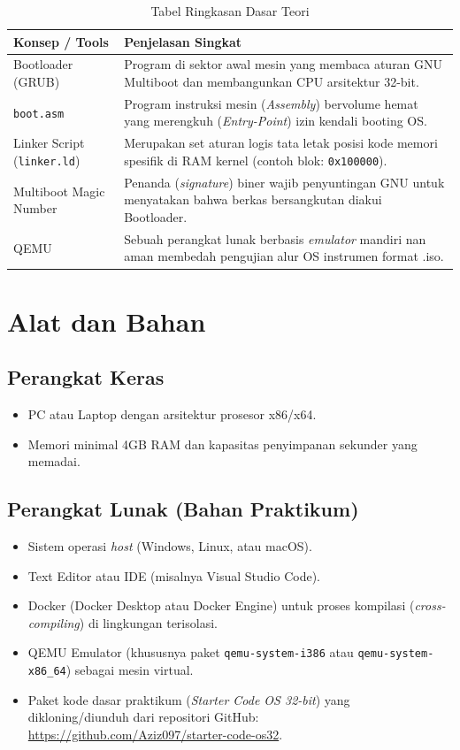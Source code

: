 \newpage
\begin{table}[!ht]
	\caption{Tabel Ringkasan Dasar Teori}
	\label{tab:m07-dasar-teori}
	\centering
	\begin{tabulary}{\textwidth}{|L|L|}
		\hline
		\textbf{Konsep / Tools} & \textbf{Penjelasan Singkat} \\ \hline
		Bootloader (GRUB) & Program di sektor awal mesin yang membaca aturan GNU Multiboot dan membangunkan CPU arsitektur 32-bit. \\ \hline
		\texttt{boot.asm} & Program instruksi mesin (\textit{Assembly}) bervolume hemat yang merengkuh (\textit{Entry-Point}) izin kendali booting OS. \\ \hline
		Linker Script (\texttt{linker.ld}) & Merupakan set aturan logis tata letak posisi kode memori spesifik di RAM kernel (contoh blok: \texttt{0x100000}). \\ \hline
		Multiboot Magic Number & Penanda (\textit{signature}) biner wajib penyuntingan GNU untuk menyatakan bahwa berkas bersangkutan diakui Bootloader. \\ \hline
		QEMU & Sebuah perangkat lunak berbasis \textit{emulator} mandiri nan aman membedah pengujian alur OS instrumen format .iso. \\ \hline
	\end{tabulary}
\end{table}

\newpage
\section{Alat dan Bahan}
\label{sec:m07-alat-bahan}

\subsection{Perangkat Keras}
\begin{itemize}
	\item PC atau Laptop dengan arsitektur prosesor x86/x64.
	\item Memori minimal 4GB RAM dan kapasitas penyimpanan sekunder yang memadai.
\end{itemize}

\subsection{Perangkat Lunak (Bahan Praktikum)}
\begin{itemize}
	\item Sistem operasi \textit{host} (Windows, Linux, atau macOS).
	\item Text Editor atau IDE (misalnya Visual Studio Code).
	\item Docker (Docker Desktop atau Docker Engine) untuk proses kompilasi (\textit{cross-compiling}) di lingkungan terisolasi.
	\item QEMU Emulator (khususnya paket \texttt{qemu-system-i386} atau \texttt{qemu-system-x86\_64}) sebagai mesin virtual.
	\item Paket kode dasar praktikum (\textit{Starter Code OS 32-bit}) yang dikloning/diunduh dari repositori GitHub: \url{https://github.com/Aziz097/starter-code-os32}.
\end{itemize}

